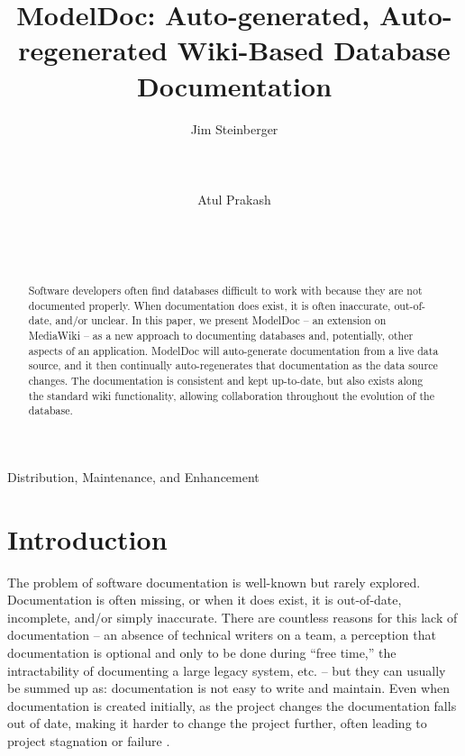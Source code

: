 \documentclass{acm_proc_article-sp}
\begin{document}
\title{{\ttlit ModelDoc}: Auto-generated, Auto-regenerated Wiki-Based Database
Documentation}

\author{
  \alignauthor
  Jim Steinberger\\
         \\
         \\
         \\
  \alignauthor
  Atul Prakash\\
         \\
         \\
         \\
}

\maketitle

\begin{abstract}
Software developers often find databases difficult to work with because they
are not documented properly.  When documentation does exist, it is often
inaccurate, out-of-date, and/or unclear.  In this paper, we present ModelDoc --
an extension on MediaWiki -- as a new approach to documenting databases and,
potentially, other aspects of an application.  ModelDoc will auto-generate
documentation from a live data source, and it then continually auto-regenerates
that documentation as the data source changes.  The documentation is consistent
and kept up-to-date, but also exists along the standard wiki functionality,
allowing collaboration throughout the evolution of the database.
\end{abstract}

{Distribution, Maintenance, and Enhancement}


\section{Introduction}
The problem of software documentation is well-known but rarely explored. 
Documentation is often missing, or when it does exist, it is out-of-date,
incomplete, and/or simply inaccurate.  There are countless reasons for
this lack of documentation -- an absence of technical writers on a team, a
perception that documentation is optional and only to be done during ``free
time,'' the intractability of documenting a large legacy system, etc. -- but
they can usually be summed up as: documentation is not easy to write and
maintain.  Even when documentation is created initially, as the project changes
the documentation falls out of date, making it harder to change the project
further, often leading to project stagnation or failure
\cite{desouza:documentation} \cite{sousa:maintenance}.
\end{document}
